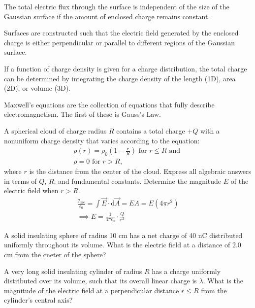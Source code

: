 \documentclass[../em.tex]{subfiles}
\begin{document}
The total electric flux through the surface is independent of the size of the Gaussian 
surface if the amount of enclosed charge remains constant.

Surfaces are constructed such that the electric field generated by the enclosed 
charge is either perpendicular or parallel to different regions of the Gaussian surface.

If a function of charge density is given for a charge distribution, the total 
charge can be determined by integrating the charge density of the length (1D), area (2D), or volume (3D).

Maxwell's equations are the collection of equations that fully describe electromagnetism. The first of these is Gauss's Law.
\begin{example}
    A spherical cloud of charge radius $R$ contains a total charge $+Q$ with a 
    nonuniform charge density that varies according to the equation:
    \begin{align*}
        \rho(r)=\rho_0\left(1-\frac{r}{R}\right) \text{ for } r\leq R \text{ and }\\
        \rho = 0 \text{ for } r>R\text{,}
    \end{align*}
    where $r$ is the distance from the center of the cloud. Express all algebraic answers in terms of $Q$, $R$, and fundamental constants. Determine the magnitude $E$ of the electric field when $r>R$.
    \begin{align*}
        \frac{q_\text{enc}}{\epsilon_0}=\int\vec{E}\cdot\mathrm{d}\vec{A}=EA=E(4\pi r^2)
        \\
        \implies E=\frac{1}{4\pi\epsilon_0}\cdot\frac{Q}{r^2}
    \end{align*}
\end{example}
\ex A solid insulating sphere of radius 10 cm has a net charge of 40 nC distributed uniformly throughout its volume. What is the electric field at a distance of 2.0 cm from the cneter of the sphere?

\ex A very long solid insulating cylinder of radius $R$ has a charge uniformly distributed over its volume, such that its overall linear charge is $\lambda$. What is the magnitude of the electric field at a perpendicular distance $r\leq R$ from the cylinder's central axis?
\end{document}
